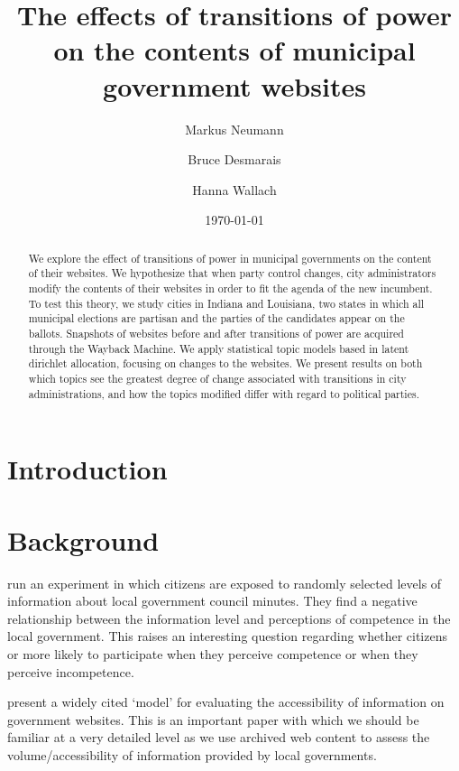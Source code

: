 \documentclass[11pt]{article}
\title{\vspace{-2cm} The effects of transitions of power on the contents of municipal government websites }
\author{ Markus Neumann \and Bruce Desmarais \and Hanna Wallach} \date{\today}
\begin{document}
\maketitle




\begin{abstract}

\noindent We explore the effect of transitions of power in municipal governments on the content of their websites. We hypothesize that when party control changes, city administrators modify the contents of their websites in order to fit the agenda of the new incumbent. To test this theory, we study cities in Indiana and Louisiana, two states in which all municipal elections are partisan and the parties of the candidates appear on the ballots. Snapshots of websites before and after transitions of power are acquired through the Wayback Machine. We apply statistical topic models based in latent dirichlet allocation, focusing on changes to the websites. We present results on both which topics see the greatest degree of change associated with transitions in city administrations, and how the topics modified differ with regard to political parties.

\end{abstract}
\thispagestyle{empty}
\section{Introduction}

\section{Background}

\cite{grimmelikhuijsen2010transparency} run an experiment in which citizens are exposed to randomly selected levels of information about local government council minutes. They find a negative relationship between the information level and perceptions of competence in the local government. This raises an interesting question regarding whether citizens or more likely to participate when they perceive competence or when they perceive incompetence.

\cite{wang2005evaluating} present a widely cited `model' for evaluating the accessibility of information on government websites. This is an important paper with which we should be familiar at a very detailed level as we use archived web content to assess the volume/accessibility of information provided by local governments.
\end{document}
